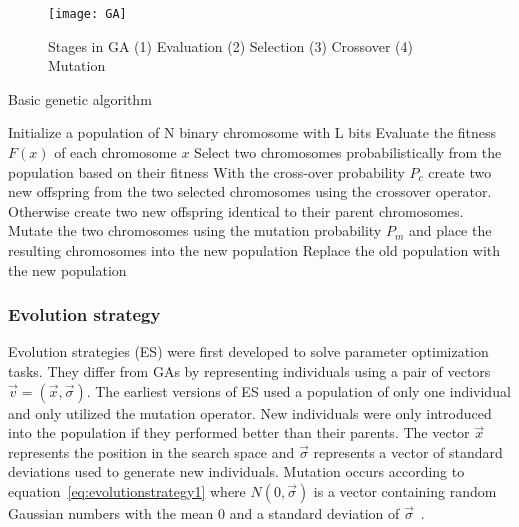 \begin{figure}[H]
  \centering
  \texttt{[image: GA]}
  \caption{Stages in GA (1) Evaluation (2) Selection (3) Crossover (4) Mutation}
  \label{fig:GA}
\end{figure}

\begin{algorithm}[h]

  \caption{Basic genetic algorithm}
  \label{algo:geneticalgorithm}
    \begin{algorithmic}
       \State Initialize a population of N binary chromosome with L bits
        \State Evaluate the fitness $F(x)$ of each chromosome $x$
        \Repeat
          \State Select two chromosomes probabilistically from the population
          \State based on their fitness
          \State With the cross-over probability $P_c$ create two new offspring
          \State from the two selected chromosomes using the crossover operator.
          \State Otherwise create two new offspring identical to their parent chromosomes.
          \State Mutate the two chromosomes using the mutation probability $P_m$
          \State and place the resulting chromosomes into the new population
        \State Replace the old population with the new population
       \EndWhile
    \end{algorithmic}
\end{algorithm}

\subsubsection{Evolution strategy}

Evolution strategies (ES) were first developed to solve parameter optimization tasks. They differ from GAs by representing individuals using a pair of vectors $\vec{v} = (\vec{x},\vec{\sigma})$. The earliest versions of ES used a population of only one individual and only utilized the mutation operator. New individuals were only introduced into the population if they performed better than their parents. The vector $\vec{x}$ represents the position in the search space and $\vec{\sigma}$ represents a vector of standard deviations used to generate new individuals. Mutation occurs according to equation~\ref{eq:evolutionstrategy1} where $N(0,\vec{\sigma})$ is a vector containing random Gaussian numbers with the mean $0$ and a standard deviation of $\vec{\sigma}$~\cite{Michalewicz1997}.

